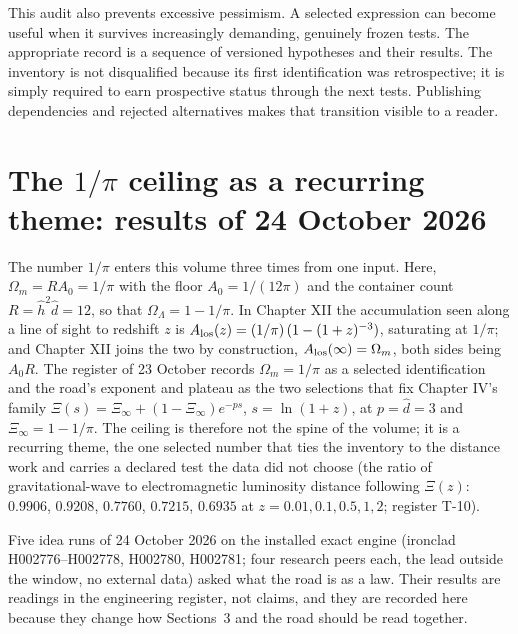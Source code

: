 This audit also prevents excessive pessimism. A selected expression can become useful when it survives increasingly demanding, genuinely frozen tests. The appropriate record is a sequence of versioned hypotheses and their results. The inventory is not disqualified because its first identification was retrospective; it is simply required to earn prospective status through the next tests. Publishing dependencies and rejected alternatives makes that transition visible to a reader.

\section{The \texorpdfstring{$1/\pi$}{1/pi} ceiling as a recurring theme: results of 24 October 2026}\label{sec:c8:ceiling2026}
The number $1/\pi$ enters this volume three times from one input. Here, $\Omega_m=RA_0=1/\pi$ with the floor $A_0=1/(12\pi)$ and the container count $R=\hat h^2\hat d=12$, so that $\Omega_\Lambda=1-1/\pi$. In Chapter XII the accumulation seen along a line of sight to redshift $z$ is $A_{\rm los}(z)=(1/\pi)\,(1-(1+z)^{-3})$, saturating at $1/\pi$; and Chapter XII joins the two by construction, $A_{\rm los}(\infty)=\Omega_m$, both sides being $A_0R$. The register of 23 October records $\Omega_m=1/\pi$ as a selected identification and the road's exponent and plateau as the two selections that fix Chapter IV's family $\Xi(s)=\Xi_\infty+(1-\Xi_\infty)e^{-ps}$, $s=\ln(1+z)$, at $p=\hat d=3$ and $\Xi_\infty=1-1/\pi$. The ceiling is therefore not the spine of the volume; it is a recurring theme, the one selected number that ties the inventory to the distance work and carries a declared test the data did not choose (the ratio of gravitational-wave to electromagnetic luminosity distance following $\Xi(z)$: $0.9906$, $0.9208$, $0.7760$, $0.7215$, $0.6935$ at $z=0.01,0.1,0.5,1,2$; register T-10).

Five idea runs of 24 October 2026 on the installed exact engine (ironclad H002776--H002778, H002780, H002781; four research peers each, the lead outside the window, no external data) asked what the road is as a law. Their results are readings in the engineering register, not claims, and they are recorded here because they change how Sections~3 and the road should be read together.

